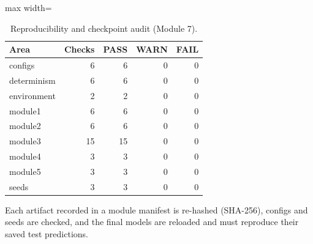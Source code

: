 \begin{table}[t]
\centering
\caption{Reproducibility and checkpoint audit (Module 7).}
\label{tab:audit}
\footnotesize
\setlength{\tabcolsep}{3.5pt}
\begin{adjustbox}{max width=\linewidth}
\begin{tabular}{lrrrr}
\toprule
Area & Checks & PASS & WARN & FAIL \\
\midrule
configs & 6 & 6 & 0 & 0 \\
determinism & 6 & 6 & 0 & 0 \\
environment & 2 & 2 & 0 & 0 \\
module1 & 6 & 6 & 0 & 0 \\
module2 & 6 & 6 & 0 & 0 \\
module3 & 15 & 15 & 0 & 0 \\
module4 & 3 & 3 & 0 & 0 \\
module5 & 3 & 3 & 0 & 0 \\
seeds & 3 & 3 & 0 & 0 \\
\bottomrule
\end{tabular}
\end{adjustbox}
\par\vspace{2pt}
\parbox{0.98\linewidth}{\scriptsize Each artifact recorded in a module manifest is re-hashed (SHA-256), configs and seeds are checked, and the final models are reloaded and must reproduce their saved test predictions.}
\end{table}
